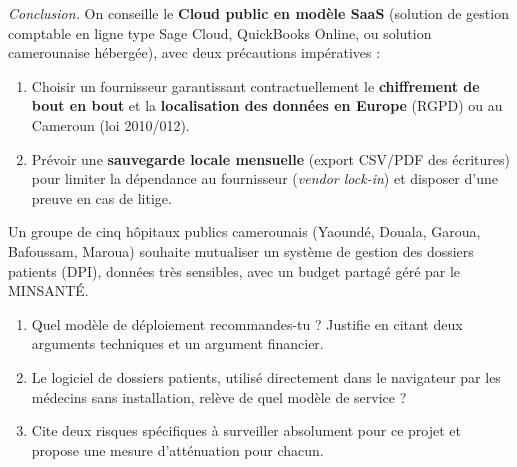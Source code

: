 \documentclass[11pt]{article}
\begin{document}
\begin{exoresolu}
\emph{Conclusion.} On conseille le \textbf{Cloud public en modèle SaaS} (solution de gestion comptable en ligne type Sage Cloud, QuickBooks Online, ou solution camerounaise hébergée), avec deux précautions impératives :
\begin{enumerate}
\item Choisir un fournisseur garantissant contractuellement le \textbf{chiffrement de bout en bout} et la \textbf{localisation des données en Europe} (RGPD) ou au Cameroun (loi 2010/012).
\item Prévoir une \textbf{sauvegarde locale mensuelle} (export CSV/PDF des écritures) pour limiter la dépendance au fournisseur (\emph{vendor lock-in}) et disposer d'une preuve en cas de litige.
\end{enumerate}
\end{exoresolu}

\begin{exercice}
Un groupe de cinq hôpitaux publics camerounais (Yaoundé, Douala, Garoua, Bafoussam, Maroua) souhaite mutualiser un système de gestion des dossiers patients (DPI), données très sensibles, avec un budget partagé géré par le MINSANTÉ.
\begin{enumerate}
\item Quel modèle de déploiement recommandes-tu ? Justifie en citant deux arguments techniques et un argument financier.
\item Le logiciel de dossiers patients, utilisé directement dans le navigateur par les médecins sans installation, relève de quel modèle de service ?
\item Cite deux risques spécifiques à surveiller absolument pour ce projet et propose une mesure d'atténuation pour chacun.
\end{enumerate}
\end{exercice}
\end{document}
